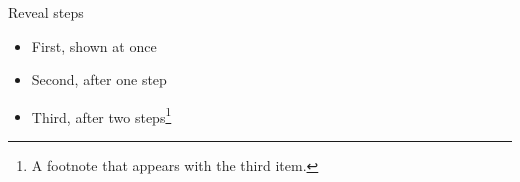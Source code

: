 \begin{standardframe}{Reveal steps}
	\begin{itemize}
		\item First, shown at once
		\pause
		\item Second, after one step
		\pause
		\item Third, after two steps\footnote{A footnote that appears with the third item.}
	\end{itemize}
\end{standardframe}
